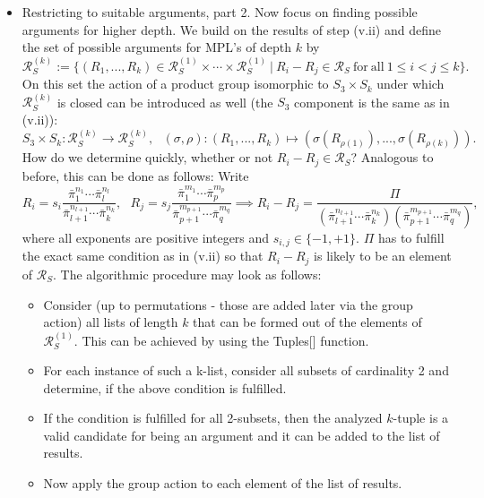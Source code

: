 \documentclass[10pt]{article}
\newcommand*{\rff}{\mathcal{R}}
\begin{document}
\begin{itemize}
\begin{itemize}
\item[(v.iii)] Restricting to suitable arguments, part 2. Now focus on finding possible arguments for higher depth. We build on the results of step (v.ii) and define the set of possible arguments for MPL's of depth $k$ by
\begin{equation*}
\rff_S^{(k)} := \{ (R_1, ..., R_k) \in \rff_S^{(1)} \times \cdots \times \rff_S^{(1)} \ | \ R_i - R_j \in \rff_S \ \mathrm{for \ all \ } 1 \leq i < j \leq k \}.
\end{equation*}
On this set the action of a product group isomorphic to $S_3 \times S_k$ under which $\rff_S^{(k)}$ is closed can be introduced as well (the $S_3$ component is the same as in (v.ii)):
\begin{equation*}
S_3 \times S_k : \rff_S^{(k)} \to \rff_S^{(k)}, \ \ \ (\sigma, \rho) : (R_1, ..., R_k) \mapsto (\sigma(R_{\rho(1)}), ..., \sigma(R_{\rho(k)})).
\end{equation*}
How do we determine quickly, whether or not $R_i - R_j \in \rff_S$? Analogous to before, this can be done as follows: Write
\begin{equation*}
R_i = s_i \frac{\bar \pi_1^{n_1} \cdots \bar \pi_l^{n_l}}{\bar \pi_{l+1}^{n_{l+1}} \cdots \bar \pi_{k}^{n_k}}, \ \ \ R_j = s_j \frac{\bar \pi_1^{m_1} \cdots \bar \pi_p^{m_p}}{\bar \pi_{p+1}^{m_{p+1}} \cdots \bar \pi_{q}^{m_q}} \implies R_i - R_j = \frac{\Pi}{(\bar \pi_{l+1}^{n_{l+1}} \cdots \bar \pi_{k}^{n_k})(\bar \pi_{p+1}^{m_{p+1}} \cdots \bar \pi_{q}^{m_q})},
\end{equation*}
where all exponents are positive integers and $s_{i,j} \in \{-1, +1\}$. $\Pi$ has to fulfill the exact same condition as in (v.ii) so that $R_i - R_j$ is likely to be an element of $\rff_S$. The algorithmic procedure may look as follows:
\begin{itemize}
\item Consider (up to permutations - those are added later via the group action) all lists of length $k$ that can be formed out of the elements of $\rff_S^{(1)}$. This can be achieved by using the Tuples[] function.
\item For each instance of such a k-list, consider all subsets of cardinality 2 and determine, if the above condition is fulfilled.
\item If the condition is fulfilled for all 2-subsets, then the analyzed $k$-tuple is a valid candidate for being an argument and it can be added to the list of results.
\item Now apply the group action to each element of the list of results.

\end{itemize}
\end{itemize}
\end{itemize}
\end{document}
